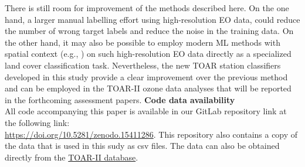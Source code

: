 \documentclass[gmd, manuscript]{copernicus}
\begin{document}
There is still room for improvement of the methods described here. On the one hand, a larger manual labelling effort using high-resolution EO data, could reduce the number of wrong target labels and reduce the noise in the training data. On the other hand, it may also be possible to employ modern ML methods with spatial context (e.g., \citep{szwarcman2024prithvi}) on such high-resolution EO data directly as a specialized land cover classification task. Nevertheless, the new TOAR station classifiers developed in this study provide a clear improvement over the previous method and can be employed in the TOAR-II ozone data analyses that will be reported in the forthcoming assessment papers.
\newpage
\textbf{Code data availability }\\All code accompanying this paper is available in our GitLab repository  link\citep{Mache2025TOARClassifier} at the following link: \\
\href{https://doi.org/10.5281/zenodo.15411286}{https://doi.org/10.5281/zenodo.15411286}. 
This repository also contains a copy of the data that is used in this sudy as csv files. The data can also be obtained directly from the  \href{https://toar-data.fz-juelich.de/api/v2}{TOAR-II database}. %






\end{document}
